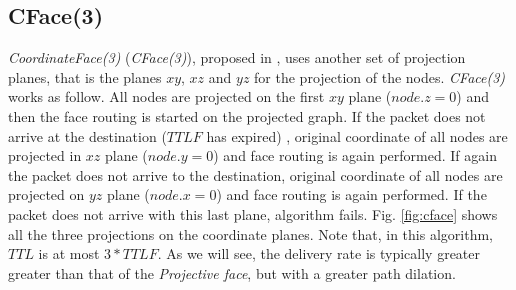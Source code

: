 \documentclass[journal,comsoc]{IEEEtran}
\begin{document}
\subsection{CFace(3)}
\emph{CoordinateFace(3)} (\emph{CFace(3)}), proposed in \cite{abdallah:random}, uses another set of projection planes, that is the planes \(xy\), \(xz\) and \(yz\) for the projection of the nodes. \emph{CFace(3)} works as follow. All nodes are projected on the first \(xy\) plane (\(node.z = 0\)) and then the face routing is started on the projected graph. If the packet does not arrive at the destination (\(TTLF\) has expired) , original coordinate of all nodes are projected in \(xz\) plane (\(node.y = 0\)) and face routing is again performed. If again the packet does not arrive to the destination, original coordinate of all nodes are projected on \(yz\) plane (\(node.x = 0\)) and face routing is again performed. If the packet does not arrive with this last plane, algorithm fails. Fig. \ref{fig:cface} shows all the three projections on the coordinate planes. Note that, in this algorithm, \(TTL\) is at most \(3*TTLF\). As we will see, the delivery rate is typically greater greater than that of the \emph{Projective face}, but with a greater path dilation.
\end{document}
